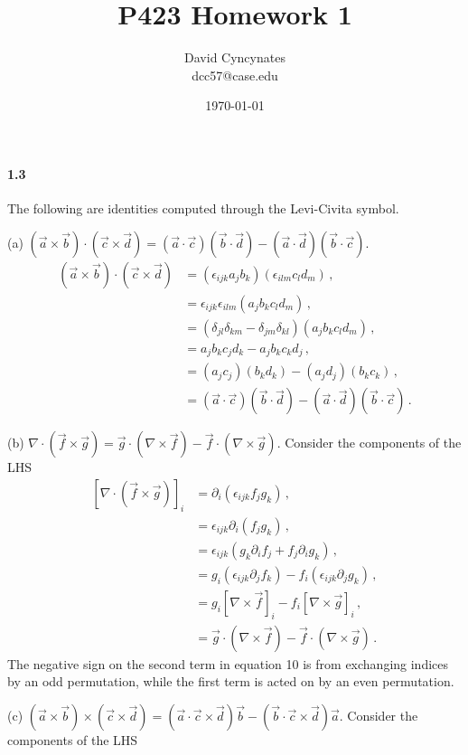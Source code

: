 \documentclass{article}
\title{P423 Homework 1}
\author{David Cyncynates \\ dcc57@case.edu}
\date{\today}
\newcommand*\p[1]{\left(#1\right)}
\newcommand*\ps[1]{\left[#1\right]}
\begin{document}
\maketitle
\paragraph{1.3} The following are identities computed through the Levi-Civita symbol.
\begin{description}
\item{(a)} $(\vec a\times\vec b)\cdot(\vec c\times\vec d) = (\vec a\cdot\vec c)(\vec b\cdot\vec d)-(\vec a\cdot\vec d)(\vec b\cdot\vec c)$.
\begin{align}
(\vec a\times\vec b)\cdot(\vec c\times\vec d)&=(\epsilon_{ijk}a_j b_k)(\epsilon_{ilm}c_l d_m)\,,\\
&=\epsilon_{ijk}\epsilon_{ilm}(a_j b_k c_l d_m)\,,\\
&=\p{\delta_{jl}\delta_{km}-\delta_{jm}\delta_{kl}}(a_j b_k c_l d_m)\,,\\
&=a_j b_k c_j d_k-a_j b_k c_k d_j\,,\\
&=(a_j c_j) (b_k d_k)-(a_j d_j) (b_k c_k)\,,\\
&=(\vec a\cdot\vec c)(\vec b\cdot\vec d)-(\vec a\cdot\vec d)(\vec b\cdot\vec c)\,.
\end{align}
\item{(b)} $\nabla\cdot(\vec f\times\vec g) = \vec g\cdot(\nabla\times\vec f)-\vec f\cdot(\nabla\times\vec g)$. Consider the components of the LHS
\begin{align}
\ps{\nabla\cdot(\vec f\times\vec g)}_i &=\partial_i(\epsilon_{ijk} f_j g_k)\,,\\
&= \epsilon_{ijk}\partial_i(f_j g_k)\,,\\
&= \epsilon_{ijk}(g_k\partial_if_j +f_j \partial_i g_k)\,,\\
&=g_i (\epsilon_{ijk}\partial_j f_k) - f_i (\epsilon_{ijk}\partial_j g_k)\,,\\
&=g_i \ps{\nabla\times \vec f}_i- f_i \ps{\nabla\times\vec g}_i\,,\\
&=\vec g\cdot \p{\nabla\times \vec f}- \vec f\cdot \p{\nabla\times\vec g}\,.
\end{align}
The negative sign on the second term in equation 10 is from exchanging indices by an odd permutation, while the first term is acted on by an even permutation.
\item{(c)} $(\vec a\times\vec b)\times(\vec c\times\vec d) = (\vec a\cdot\vec c\times\vec d)\vec b-(\vec b\cdot\vec c\times\vec d)\vec a$. Consider the components of the LHS

\end{description}
\end{document}
